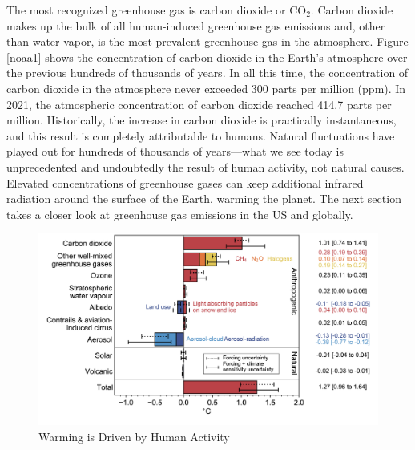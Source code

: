 The most recognized greenhouse gas is carbon dioxide or CO$_2$. Carbon dioxide makes up the bulk of all human-induced greenhouse gas emissions and, other than water vapor, is the most prevalent greenhouse gas in the atmosphere. Figure \ref{noaa1} shows the concentration of carbon dioxide in the Earth's atmosphere over the previous hundreds of thousands of years. In all this time, the concentration of carbon dioxide in the atmosphere never exceeded 300 parts per million (ppm). In 2021, the atmospheric concentration of carbon dioxide reached 414.7 parts per million. Historically, the increase in carbon dioxide is practically instantaneous, and this result is completely attributable to humans. Natural fluctuations have played out for hundreds of thousands of years---what we see today is unprecedented and undoubtedly the result of human activity, not natural causes. Elevated concentrations of greenhouse gases can keep additional infrared radiation around the surface of the Earth, warming the planet. The next section takes a closer look at greenhouse gas emissions in the US and globally. 

\begin{figure}
\centering
\caption{Warming is Driven by Human Activity \label{forcing}}
\includegraphics[width=\textwidth]{figures/chapter1_figures/ipcc_radiative_forcing.png}
\end{figure}

